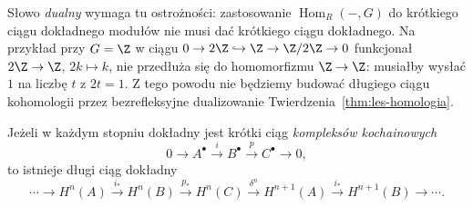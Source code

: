 Słowo \emph{dualny} wymaga tu ostrożności:
zastosowanie $\operatorname{Hom}_R(-,G)$
do krótkiego ciągu dokładnego modułów
nie musi dać krótkiego ciągu dokładnego.
Na przykład przy $G=\Z$ w ciągu
$0\to2\Z\hookrightarrow\Z\to\Z/2\Z\to0$
funkcjonał $2\Z\to\Z$, $2k\mapsto k$,
nie przedłuża się do homomorfizmu
$\Z\to\Z$: musiałby wysłać $1$
na liczbę $t$ z $2t=1$.
Z tego powodu nie będziemy budować
długiego ciągu kohomologii przez
bezrefleksyjne dualizowanie
Twierdzenia~\ref{thm:les-homologia}.

\begin{twierdzenie}
\label{thm:les-kohomologia}
Jeżeli w każdym stopniu dokładny jest
krótki ciąg \emph{kompleksów kochainowych}
\[
 0\longrightarrow A^\bullet\xrightarrow{i}B^\bullet
 \xrightarrow{p}C^\bullet\longrightarrow0,
\]
to istnieje długi ciąg dokładny
\begin{equation}\label{eq:les-kohomologia}
 \cdots\longrightarrow H^n(A)
 \xrightarrow{i_*}H^n(B)
 \xrightarrow{p_*}H^n(C)
 \xrightarrow{\delta^n}H^{n+1}(A)
 \xrightarrow{i_*}H^{n+1}(B)\longrightarrow\cdots.
\end{equation}
\end{twierdzenie}
